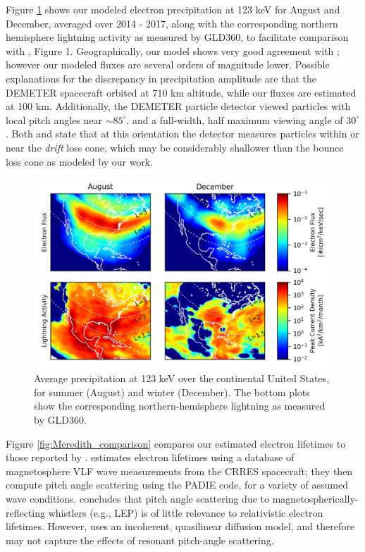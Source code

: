 Figure \ref{fig:gemelos_comparison} shows our modeled electron precipitation at 123 keV for August and December, averaged over 2014 - 2017, along with the corresponding northern hemisphere lightning activity as measured by GLD360, to facilitate comparison with \cite{Gemelos2009}, Figure 1. Geographically, our model shows very good agreement with \citeauthor{Gemelos2009}; however our modeled fluxes are several orders of magnitude lower. Possible explanations for the discrepancy in precipitation amplitude are that the DEMETER spacecraft orbited at 710 km altitude, while our fluxes are estimated at 100 km. Additionally, the DEMETER particle detector viewed particles with local pitch angles near $\sim 85^\circ$, and a full-width, half maximum viewing angle of $30^\circ$. Both \citeauthor{Gemelos2009} and \cite{Sauvaud2006} state that at this orientation the detector measures particles within or near the \emph{drift} loss cone, which may be considerably shallower than the bounce loss cone as modeled by our work.

\begin{figure}[]
\begin{center}
\includegraphics{figures/Gemelos_comparison.png}
\caption[Precipitation at 123 keV over the continental United States, for summer and winter]{Average precipitation at 123 keV over the continental United States, for summer (August) and winter (December). The bottom plots show the corresponding northern-hemisphere lightning as measured by GLD360.}
\label{fig:gemelos_comparison}
\end{center}
\end{figure}

Figure \ref{fig:Meredith_comparison} compares our estimated electron lifetimes to those reported by \cite{Meredith2007}. \citeauthor{Meredith2007} estimates electron lifetimes using a database of magnetosphere VLF wave measurements from the CRRES spacecraft; they then compute pitch angle scattering using the PADIE code, for a variety of assumed wave conditions. \citeauthor{Meredith2007} concludes that pitch angle scattering due to magnetospherically-reflecting whistlers (e.g., LEP) is of little relevance to relativistic electron lifetimes. However, \citeauthor{Meredith2007} uses an incoherent, quasilinear diffusion model, and therefore may not capture the effects of resonant pitch-angle scattering.

